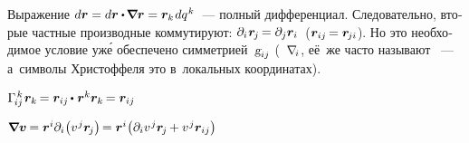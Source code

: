 \begin{otherlanguage}{russian}
Выражение ${d\bm{r} = d\bm{r} \dotp \hspace{-0.2ex} \tikzmark{beginItsE} \boldnabla \bm{r} \tikzmark{endItsE} = \bm{r}_k \hspace{0.2ex} dq^{\hspace{.1ex}k}}$~--- полный дифференциал. Следовательно, вторые частные производные коммутируют: ${\partial_i \hspace{.12ex} \bm{r}_{\hspace{-0.2ex}j} \hspace{-0.2ex} = \partial_j \bm{r}_i}$~(${\bm{r}_{ij} \hspace{-0.2ex} = \bm{r}_{\hspace{-0.2ex}ji}}$).
Но это необходимое условие уж\'{е} обеспечено симметрией~${\textsl{g}_{ij}}$ (~$\nabla_{\hspace{-0.32ex}i\hspace{.1ex}}$, её~же часто называют ~--- а~символы Христоффеля это  в~локальных координатах).

${\Gamma_{\hspace{-0.25ex}ij}^{\hspace{.25ex}k} \hspace{.2ex} \bm{r}_k \hspace{-0.2ex} = \bm{r}_{ij} \hspace{-0.16ex} \dotp \hspace{.1ex} \bm{r}^k \bm{r}_k \hspace{-0.2ex} = \bm{r}_{ij}}$

$\bm{\nabla}\hspace{-0.2ex} \bm{v} \hspace{-0.16ex}
= \bm{r}^{i} \partial_i \hspace{-0.32ex} \left( v^{\hspace{.12ex}j} \bm{r}_{\hspace{-0.2ex}j} \right) \hspace{-0.25ex}
= \bm{r}^{i} \hspace{-0.32ex} \left( \partial_i v^{\hspace{.12ex}j} \bm{r}_{\hspace{-0.2ex}j} \hspace{-0.12ex} + v^{\hspace{.12ex}j} \bm{r}_{ij} \right)$


\end{otherlanguage}
